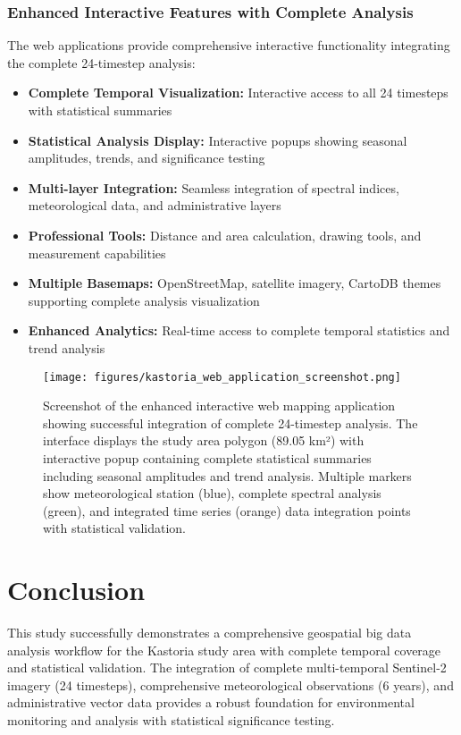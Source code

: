\documentclass[a4paper,12pt]{article}
\begin{document}
\subsubsection{Enhanced Interactive Features with Complete Analysis}

The web applications provide comprehensive interactive functionality integrating
the complete 24-timestep analysis:

\begin{itemize}
    \item \textbf{Complete Temporal Visualization:} Interactive access to all 24 timesteps with statistical summaries
    \item \textbf{Statistical Analysis Display:} Interactive popups showing seasonal amplitudes, trends, and significance testing
    \item \textbf{Multi-layer Integration:} Seamless integration of spectral indices, meteorological data, and administrative layers
    \item \textbf{Professional Tools:} Distance and area calculation, drawing tools, and measurement capabilities
    \item \textbf{Multiple Basemaps:} OpenStreetMap, satellite imagery, CartoDB themes supporting complete analysis visualization
    \item \textbf{Enhanced Analytics:} Real-time access to complete temporal statistics and trend analysis
\end{itemize}

\begin{figure}[H]
    \centering
    \texttt{[image: figures/kastoria\_web\_application\_screenshot.png]}
    \caption{Screenshot of the enhanced interactive web mapping application showing successful integration of complete 24-timestep analysis. The interface displays the study area polygon (89.05 km²) with interactive popup containing complete statistical summaries including seasonal amplitudes and trend analysis. Multiple markers show meteorological station (blue), complete spectral analysis (green), and integrated time series (orange) data integration points with statistical validation.}
    \label{fig:web_app}
\end{figure}

\section{Conclusion}

This study successfully demonstrates a comprehensive geospatial big data
analysis workflow for the Kastoria study area with complete temporal coverage
and statistical validation. The integration of complete multi-temporal Sentinel-2
imagery (24 timesteps), comprehensive meteorological observations (6 years), and
administrative vector data provides a robust foundation for environmental
monitoring and analysis with statistical significance testing.
\end{document}

